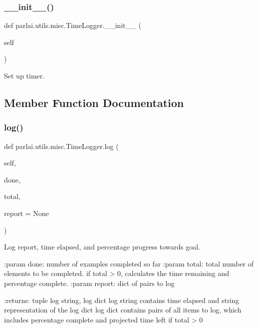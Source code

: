 \subsubsection{\texorpdfstring{\+\_\+\+\_\+init\+\_\+\+\_\+()}{\_\_init\_\_()}}
{\footnotesize\ttfamily def parlai.\+utils.\+misc.\+Time\+Logger.\+\_\+\+\_\+init\+\_\+\+\_\+ (\begin{DoxyParamCaption}\item[{}]{self }\end{DoxyParamCaption})}

\begin{DoxyVerb}Set up timer.
\end{DoxyVerb}
 

\subsection{Member Function Documentation}
\mbox{\label{classparlai_1_1utils_1_1misc_1_1TimeLogger_a52458d882781ad6a6cbcea479ff495de}} 
\subsubsection{\texorpdfstring{log()}{log()}}
{\footnotesize\ttfamily def parlai.\+utils.\+misc.\+Time\+Logger.\+log (\begin{DoxyParamCaption}\item[{}]{self,  }\item[{}]{done,  }\item[{}]{total,  }\item[{}]{report = {\ttfamily None} }\end{DoxyParamCaption})}

\begin{DoxyVerb}Log report, time elapsed, and percentage progress towards goal.

:param done: number of examples completed so far
:param total: total number of elements to be completed. if total > 0,
      calculates the time remaining and percentage complete.
:param report: dict of pairs to log

:returns: tuple log string, log dict
    log string contains time elapsed and string representation of
    the log dict
    log dict contains pairs of all items to log, which includes
    percentage complete and projected time left if total > 0
\end{DoxyVerb}
 \mbox{\label{classparlai_1_1utils_1_1misc_1_1TimeLogger_aa8e859dc10c12159501bbf545ca62a51}} 
